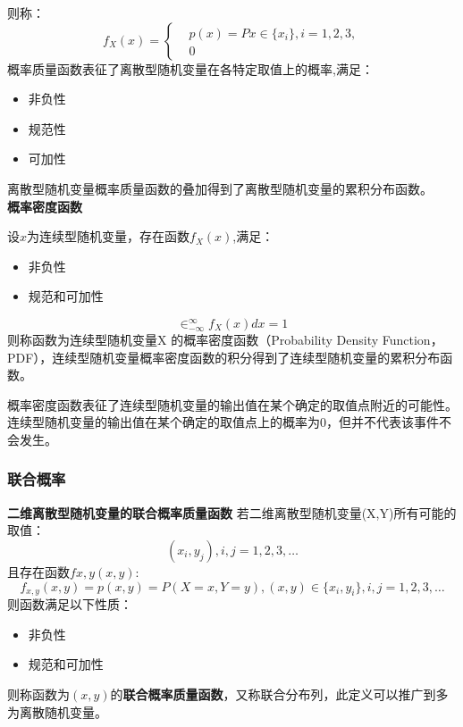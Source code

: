 \documentclass[12pt]{ctexart}
\begin{document}
则称：
\begin{equation}
        f_X(x) = \left\{
            \begin{aligned}
            & p(x)=P  x\in \{x_i\},i=1,2,3, \\
            & 0 
        \end{aligned}
        \right.
\end{equation}
概率质量函数表征了离散型随机变量在各特定取值上的概率,满足：
\begin{itemize}
    \item 非负性
    \item 规范性
    \item 可加性
\end{itemize}
离散型随机变量概率质量函数的叠加得到了离散型随机变量的累积分布函数。
~\\
\textbf{概率密度函数}
\par
设$x$为连续型随机变量，存在函数$f_X(x)$,满足：
\begin{itemize}
    \item 非负性
    \item 规范和可加性
\end{itemize}
\[
  \in_{-\infty}^{\infty}f_X(x)dx = 1  
\]
则称函数为连续型随机变量X 的概率密度函数（Probability Density Function，PDF），连续型随机变量概率密度函数的积分得到了连续型随机变量的累积分布函数。

概率密度函数表征了连续型随机变量的输出值在某个确定的取值点附近的可能性。连续型随机变量的输出值在某个确定的取值点上的概率为0，但并不代表该事件不会发生。

\subsubsection{联合概率}
\textcolor{myblue}{\textbf{二维离散型随机变量的联合概率质量函数}}
若二维离散型随机变量(X,Y)所有可能的取值：
\begin{equation}
    (x_i,y_j),i,j = 1,2,3,\dots
\end{equation}
且存在函数$fx,y(x,y)$:
\begin{equation}
    f_{x,y}(x,y)=p(x,y)=P(X=x,Y=y), (x,y)\in \{x_i,y_i\},i,j=1,2,3,\dots
\end{equation}
则函数满足以下性质：
\begin{itemize}
    \item 非负性
    \item 规范和可加性
\end{itemize}
则称函数为$(x,y)$的\textbf{联合概率质量函数}，又称联合分布列，此定义可以推广到多为离散随机变量。
\end{document}
